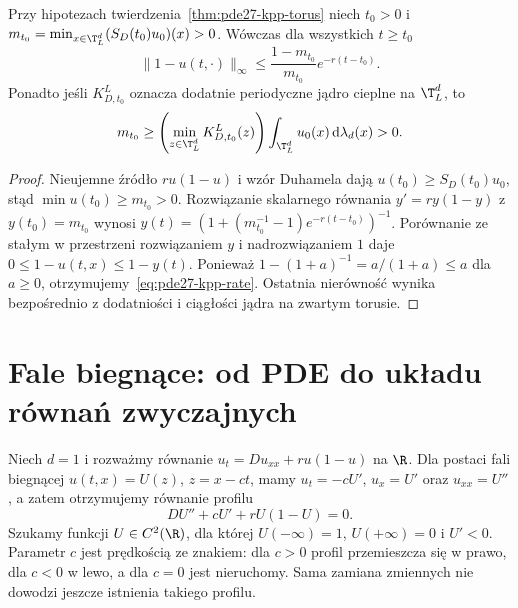\begin{wniosek}
\label{cor:pde27-kpp-rate}
Przy hipotezach twierdzenia~\ref{thm:pde27-kpp-torus}
niech $t_0>0$ i
$m_{t_0}=\min_{x\in\T_L^d}(S_D(t_0)u_0)(x)>0$.
Wówczas dla wszystkich $t\ge t_0$
\begin{equation}\label{eq:pde27-kpp-rate}
 \|1-u(t,\cdot)\|_\infty\le
 \frac{1-m_{t_0}}{m_{t_0}}e^{-r(t-t_0)}.
\end{equation}
Ponadto jeśli $K_{D,t_0}^L$ oznacza dodatnie
periodyczne jądro cieplne na $\T_L^d$, to
\[
 m_{t_0}\ge\left(\min_{z\in\T_L^d}K_{D,t_0}^L(z)\right)
 \int_{\T_L^d}u_0(x)\,\mathrm d\lambda_d(x)>0.
\]
\end{wniosek}
\begin{proof}
Nieujemne źródło $ru(1-u)$ i wzór Duhamela dają
$u(t_0)\ge S_D(t_0)u_0$, stąd
$\min u(t_0)\ge m_{t_0}>0$.
Rozwiązanie skalarnego równania
$y'=ry(1-y)$ z $y(t_0)=m_{t_0}$ wynosi
$y(t)=(1+(m_{t_0}^{-1}-1)e^{-r(t-t_0)})^{-1}$.
Porównanie ze stałym w przestrzeni rozwiązaniem $y$
i nadrozwiązaniem $1$ daje
$0\le1-u(t,x)\le1-y(t)$.
Ponieważ $1-(1+a)^{-1}=a/(1+a)\le a$
dla $a\ge0$, otrzymujemy~\eqref{eq:pde27-kpp-rate}.
Ostatnia nierówność wynika bezpośrednio z dodatniości
i ciągłości jądra na zwartym torusie.
\end{proof}


\section{Fale biegnące: od PDE do układu równań zwyczajnych}
Niech $d=1$ i rozważmy równanie
$u_t=Du_{xx}+ru(1-u)$ na $\R$.
Dla postaci fali biegnącej $u(t,x)=U(z)$, $z=x-ct$,
mamy $u_t=-cU'$, $u_x=U'$ oraz $u_{xx}=U''$,
a zatem otrzymujemy równanie profilu
\begin{equation}\label{eq:pde27-wave}
 DU''+cU'+rU(1-U)=0.
\end{equation}
Szukamy funkcji $U\in C^2(\R)$, dla której
$U(-\infty)=1$, $U(+\infty)=0$ i $U'<0$.
Parametr $c$ jest prędkością ze znakiem:
dla $c>0$ profil przemieszcza się w prawo,
dla $c<0$ w lewo, a dla $c=0$ jest nieruchomy. Sama zamiana zmiennych
nie dowodzi jeszcze istnienia takiego profilu.

